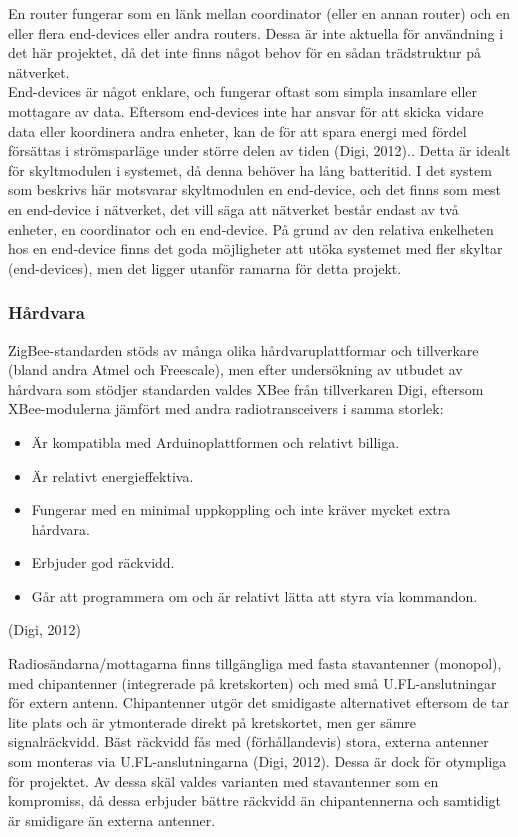 \documentclass[a4paper,11pt]{article}
\begin{document}
En router fungerar som en länk mellan coordinator (eller en annan router) och en eller flera end-devices eller andra routers. Dessa är inte aktuella för användning i det här projektet, då det inte finns något behov för en sådan trädstruktur på nätverket. \\

End-devices är något enklare, och fungerar oftast som simpla insamlare eller mottagare av data. Eftersom end-devices inte har ansvar för att skicka vidare data eller koordinera andra enheter, kan de för att spara energi med fördel försättas i strömsparläge under större delen av tiden (Digi, 2012).. Detta är idealt för skyltmodulen i systemet, då denna behöver ha lång batteritid. I det system som beskrivs här motsvarar skyltmodulen en end-device, och det finns som mest en end-device i nätverket, det vill säga att nätverket består endast av två enheter, en coordinator och en end-device. På grund av den relativa enkelheten hos en end-device finns det goda möjligheter att utöka systemet med fler skyltar (end-devices), men det ligger utanför ramarna för detta projekt.

\subsubsection{Hårdvara}
ZigBee-standarden stöds av många olika hårdvaruplattformar och tillverkare (bland andra Atmel och Freescale), men efter undersökning av utbudet av hårdvara som stödjer standarden valdes XBee från tillverkaren Digi, eftersom XBee-modulerna jämfört med andra radiotransceivers i samma storlek:
	
	\begin{itemize}
	\item Är kompatibla med Arduinoplattformen och relativt billiga.
    	\item Är relativt energieffektiva.
    	\item Fungerar med en minimal uppkoppling och inte kräver mycket extra hårdvara.
    	\item Erbjuder god räckvidd.
    	\item Går att programmera om och är relativt lätta att styra via kommandon.
	\end{itemize}
(Digi, 2012)
	
Radiosändarna/mottagarna finns tillgängliga med fasta stavantenner (monopol), med chipantenner (integrerade på kretskorten) och med små U.FL-anslutningar för extern antenn.
Chipantenner utgör det smidigaste alternativet eftersom de tar lite plats och är ytmonterade direkt på kretskortet, men ger sämre signalräckvidd. Bäst räckvidd fås med (förhållandevis) stora, externa antenner som monteras via U.FL-anslutningarna (Digi, 2012). Dessa är dock för otympliga för projektet. Av dessa skäl valdes varianten med stavantenner som en kompromiss, då dessa erbjuder bättre räckvidd än chipantennerna och samtidigt är smidigare än externa antenner. \\
\end{document}

